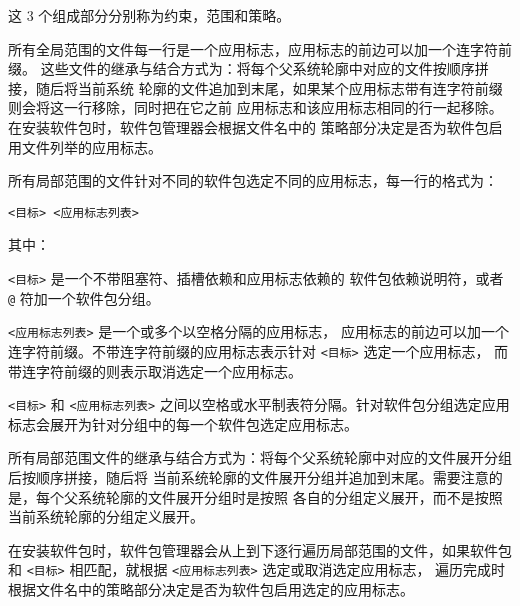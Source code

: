 这 3 个组成部分分别称为约束，范围和策略。

所有全局范围的文件每一行是一个应用标志，应用标志的前边可以加一个连字符前缀。
这些文件的继承与结合方式为：将每个父系统轮廓中对应的文件按顺序拼接，随后将当前系统
轮廓的文件追加到末尾，如果某个应用标志带有连字符前缀则会将这一行移除，同时把在它之前
应用标志和该应用标志相同的行一起移除。在安装软件包时，软件包管理器会根据文件名中的
策略部分决定是否为软件包启用文件列举的应用标志。

所有局部范围的文件针对不同的软件包选定不同的应用标志，每一行的格式为：

\begin{verbatim}
<目标> <应用标志列表>
\end{verbatim}

其中：
\begin{compactitem}
\item \texttt{<\hspace{0em}目标\hspace{0em}>} 是一个不带阻塞符、插槽依赖和应用标志依赖的
    软件包依赖说明符，或者 \texttt{@} 符加一个软件包分组。
\item \texttt{<\hspace{0em}应用标志列表\hspace{0em}>} 是一个或多个以空格分隔的应用标志，
    应用标志的前边可以加一个连字符前缀。不带连字符前缀的应用标志表示针对
    \texttt{<\hspace{0em}目标\hspace{0em}>} 选定一个应用标志，
    而带连字符前缀的则表示取消选定一个应用标志。
\end{compactitem}

\texttt{<\hspace{0em}目标\hspace{0em}>} 和 \texttt{<\hspace{0em}应用标志列表\hspace{0em}>}
之间以空格或水平制表符分隔。针对软件包分组选定应用标志会展开为针对分组中的每一个软件包选定应用标志。

所有局部范围文件的继承与结合方式为：将每个父系统轮廓中对应的文件展开分组后按顺序拼接，随后将
当前系统轮廓的文件展开分组并追加到末尾。需要注意的是，每个父系统轮廓的文件展开分组时是按照
各自的分组定义展开，而不是按照当前系统轮廓的分组定义展开。

在安装软件包时，软件包管理器会从上到下逐行遍历局部范围的文件，如果软件包和
\texttt{<\hspace{0em}目标\hspace{0em}>} 相匹配，就根据
\texttt{<\hspace{0em}应用标志列表\hspace{0em}>} 选定或取消选定应用标志，
遍历完成时根据文件名中的策略部分决定是否为软件包启用选定的应用标志。

